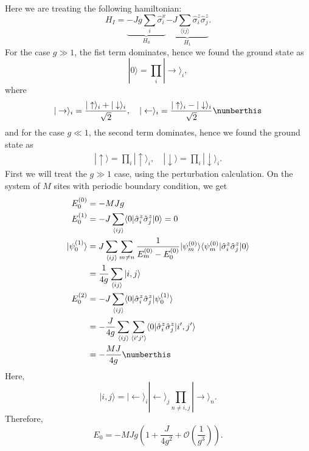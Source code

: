Here we are treating the following hamiltonian:
\begin{equation}
H_I=\underbrace{-Jg\sum_i \hat{\sigma}_i^x}_{H_0} \underbrace{-J\sum_{\langle ij\rangle} \hat{\sigma}_i^z \hat{\sigma}_j^z}_{H_1}.
\end{equation}
For the case $g\gg 1$, the fist term dominates, hence we found the ground state as
\begin{equation}
|0\rangle =\prod_{i}|\rightarrow\rangle_i,
\end{equation}
where
\begin{align*}
|\rightarrow\rangle_i=\frac{|\uparrow\rangle_i+|\downarrow\rangle_i}{\sqrt{2}}, \quad |\leftarrow\rangle_i=\frac{|\uparrow\rangle_i-|\downarrow\rangle_i}{\sqrt{2}}\numberthis
\end{align*}
and for the case $g\ll 1$, the second term dominates, hence we found the ground state as
\begin{align*}
|\uparrow\rangle=\prod_i|\uparrow\rangle_i,\quad |\downarrow \rangle=\prod_i|\downarrow\rangle_i.
\end{align*}
First we will treat the $g\gg 1$ case, using the perturbation calculation.  On the system of $M$ sites with periodic boundary condition, we get
\begin{align*}
E_0^{(0)}&=-MJg\\
E_0^{(1)}&=-J\sum_{\langle ij\rangle }\langle 0|\hat{\sigma}_i^z\hat{\sigma}_j^z|0\rangle=0\\
|\psi_0^{(1)}\rangle&=J\sum_{\langle ij\rangle}\sum_{m\neq n}\frac{1}{E_m^{(0)}-E_0^{(0)}}|\psi_m^{(0)}\rangle\langle \psi_m^{(0)}|\hat{\sigma}_i^z\hat{\sigma}_j^z|0\rangle\\
&=\frac{1}{4g}\sum_{\langle ij\rangle}|i,j\rangle\\
E_0^{(2)}&=-J\sum_{\langle ij\rangle}\langle 0|\hat{\sigma}_i^z\hat{\sigma}_j^z|\psi_0^{(1)}\rangle\\
&=-\frac{J}{4g}\sum_{\langle ij\rangle}\sum_{\langle i'j'\rangle}\langle 0|\hat{\sigma}_i^z\hat{\sigma}_j^z|i',j'\rangle\\
&=-\frac{MJ}{4g}\numberthis
\end{align*}
Here,
\begin{equation}
|i,j\rangle=|\leftarrow\rangle_i |\leftarrow\rangle_j\prod_{n\neq i,j}|\rightarrow\rangle_n.
\end{equation}
Therefore,
\begin{equation}
E_0=-MJg\left(1+\frac{J}{4g^{2}}+\mathcal{O}\left(\frac{1}{g^{3}}\right)\right).
\end{equation}


